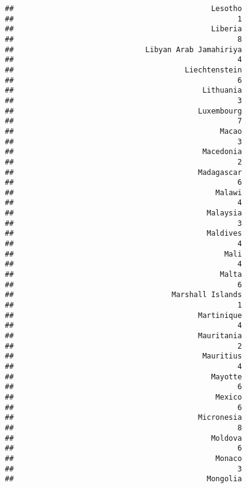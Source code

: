\documentclass[
]{article}
\begin{document}
\begin{verbatim}
##                                             Lesotho 
##                                                   1 
##                                             Liberia 
##                                                   8 
##                              Libyan Arab Jamahiriya 
##                                                   4 
##                                       Liechtenstein 
##                                                   6 
##                                           Lithuania 
##                                                   3 
##                                          Luxembourg 
##                                                   7 
##                                               Macao 
##                                                   3 
##                                           Macedonia 
##                                                   2 
##                                          Madagascar 
##                                                   6 
##                                              Malawi 
##                                                   4 
##                                            Malaysia 
##                                                   3 
##                                            Maldives 
##                                                   4 
##                                                Mali 
##                                                   4 
##                                               Malta 
##                                                   6 
##                                    Marshall Islands 
##                                                   1 
##                                          Martinique 
##                                                   4 
##                                          Mauritania 
##                                                   2 
##                                           Mauritius 
##                                                   4 
##                                             Mayotte 
##                                                   6 
##                                              Mexico 
##                                                   6 
##                                          Micronesia 
##                                                   8 
##                                             Moldova 
##                                                   6 
##                                              Monaco 
##                                                   3 
##                                            Mongolia 

\end{verbatim}
\end{document}
